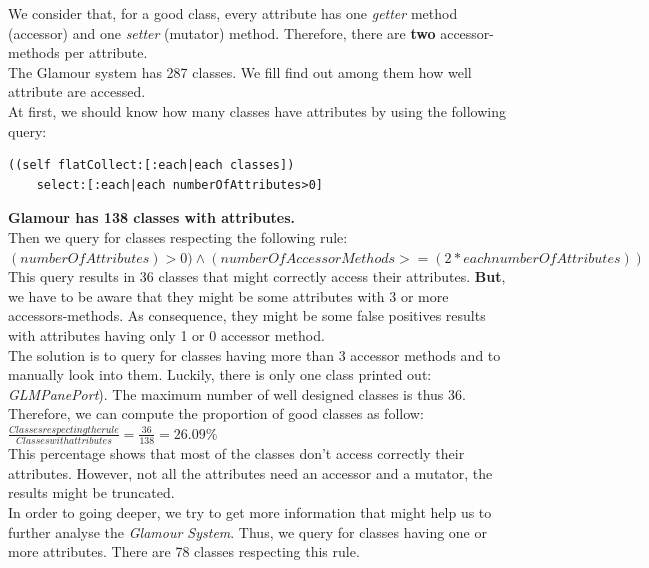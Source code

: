 \documentclass[11pt,a4paper]{article}
\begin{document}
We consider that, for a good class, every attribute has one \textit{getter} method (accessor) and one \textit{setter} (mutator) method. Therefore, there are \textbf{two} accessor-methods per attribute.\\

The Glamour system has 287 classes. We fill find out among them how well attribute are accessed.\\

At first, we should know how many classes have attributes by using the following query:\\
\begin{lstlisting}
((self flatCollect:[:each|each classes])
	select:[:each|each numberOfAttributes>0]
\end{lstlisting}

\textbf{Glamour has 138 classes with attributes.}\\

Then we query for classes respecting the following rule:\\
$(numberOfAttributes) > 0) \land (numberOfAccessorMethods >= (2*each numberOfAttributes))$\\


This query results in 36 classes that might correctly access their attributes. \textbf{But}, we have to be aware that they might be some attributes with 3 or more accessors-methods. As consequence, they might be some false positives results with attributes having only 1 or 0 accessor method.\\ 

The solution is to query for classes having more than 3 accessor methods and to manually look into them. Luckily, there is only one class printed out:  \textit{GLMPanePort}). The maximum number of well designed classes is thus 36.\\

Therefore, we can compute the proportion of good classes as follow:\\
 $\frac{Classes respecting the rule}{Classes with attributes} = \frac{36}{138} = 26.09\%$\\

This percentage shows that most of the classes don't access correctly their attributes. However, not all the attributes need an accessor and a mutator, the results might be truncated.\\ 

In order to going deeper, we try to get more information that might help us to further analyse the \textit{Glamour System}. Thus, we query for classes having one or more attributes. There are 78 classes respecting this rule.\\
\end{document}
